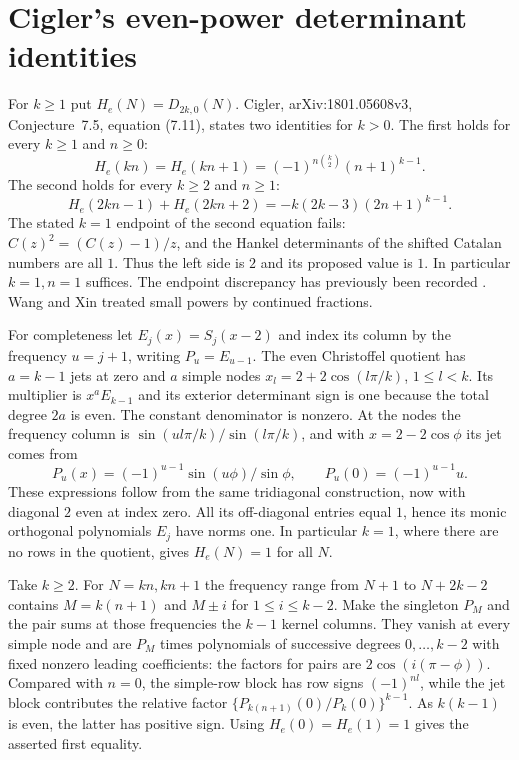 \documentclass[11pt,a4paper]{article}
\begin{document}
\section{Cigler's even-power determinant identities}
For $k\ge1$ put $H_e(N)=D_{2k,0}(N)$. Cigler, arXiv:1801.05608v3,
Conjecture~7.5, equation (7.11), states two identities for $k>0$.
The first holds for every $k\ge1$ and $n\ge0$:
\[
 H_e(kn)=H_e(kn+1)=(-1)^{n\binom{k}{2}}(n+1)^{k-1}.
\]
The second holds for every $k\ge2$ and $n\ge1$:
\begin{equation}
 H_e(2kn-1)+H_e(2kn+2)=-k(2k-3)(2n+1)^{k-1}.\tag{C7.5}
\end{equation}
The stated $k=1$ endpoint of the second equation fails: $C(z)^2=(C(z)-1)/z$, and the Hankel determinants of the shifted Catalan numbers are all $1$. Thus the left side is $2$ and its proposed value is $1$. In particular $k=1,n=1$ suffices. The endpoint discrepancy has previously been recorded \cite{TT}. Wang and Xin treated small powers by continued fractions.

For completeness let $E_j(x)=S_j(x-2)$ and index its column by the frequency $u=j+1$, writing $P_u=E_{u-1}$. The even Christoffel quotient has $a=k-1$ jets at zero and $a$ simple nodes $x_l=2+2\cos(l\pi/k)$, $1\le l<k$. Its multiplier is $x^a E_{k-1}$ and its exterior determinant sign is one because the total degree $2a$ is even. The constant denominator is nonzero. At the nodes the frequency column is $\sin(ul\pi/k)/\sin(l\pi/k)$, and with $x=2-2\cos\phi$ its jet comes from
\[
 P_u(x)=(-1)^{u-1}\sin(u\phi)/\sin\phi,\qquad P_u(0)=(-1)^{u-1}u.
\]
These expressions follow from the same tridiagonal construction, now with diagonal $2$ even at index zero. All its off-diagonal entries equal $1$, hence its monic orthogonal polynomials $E_j$ have norms one. In particular $k=1$, where there are no rows in the quotient, gives $H_e(N)=1$ for all $N$.

Take $k\ge2$. For $N=kn,kn+1$ the frequency range from $N+1$ to $N+2k-2$ contains $M=k(n+1)$ and $M\pm i$ for $1\le i\le k-2$. Make the singleton $P_M$ and the pair sums at those frequencies the $k-1$ kernel columns. They vanish at every simple node and are $P_M$ times polynomials of successive degrees $0,\ldots,k-2$ with fixed nonzero leading coefficients: the factors for pairs are $2\cos(i(\pi-\phi))$. Compared with $n=0$, the simple-row block has row signs $(-1)^{nl}$, while the jet block contributes the relative factor
$\{P_{k(n+1)}(0)/P_k(0)\}^{k-1}$.
As $k(k-1)$ is even, the latter has positive sign. Using $H_e(0)=H_e(1)=1$ gives the asserted first equality.
\end{document}
